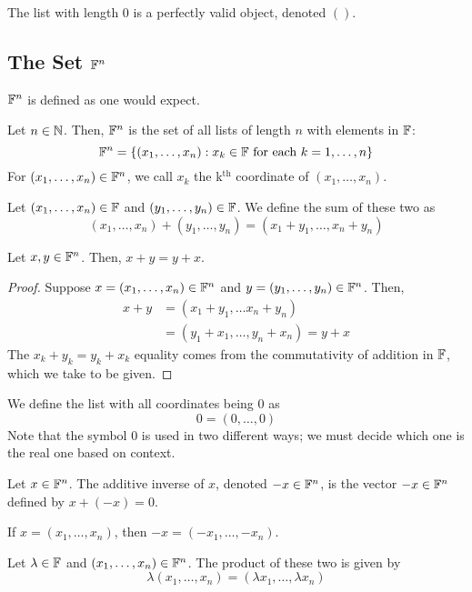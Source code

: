 The list with length $0$ is a perfectly valid object, denoted $()$.
\subsection*{The Set $\F^n$}
$\F^n$ is defined as one would expect.
\begin{definition}[$\F^n$]
    Let $n\in\mathbb{N}$. Then, $\F^n$ is the set of all lists of length $n$ with elements in $\mathbb F$:
    \[ \mathbb F^n = \{ (x_1, \dots, x_n) : x_k\in \mathbb F \text{ for each } k = 1, \dots, n\}  \]
    For $(x_1, \dots, x_n)\in\mathbb F^n$, we call $x_k$ the k$^\text{th}$ coordinate of $(x_1, \dots, x_n)$.
\end{definition}
\begin{definition}[Addition in $\F^n$]
    Let $(x_1, \dots, x_n)\in \mathbb F$ and $(y_1, \dots, y_n)\in \mathbb F$. We define the sum of these two as
    \[ (x_1, \dots, x_n) + (y_1, \dots, y_n) = (x_1 + y_1, \dots, x_n + y_n) \]
\end{definition}
\newpage
\begin{theorem}
    Let $x,y\in \mathbb F^n$. Then, $x+y=y+x$.
\end{theorem}
\begin{proof}
    Suppose $x = (x_1, \dots, x_n)\in \mathbb F^n$ and $y = (y_1, \dots, y_n) \in \mathbb F^n$. Then,
    \begin{align*}
        x+y &= (x_1 + y_1, \dots x_n + y_n) \\
        &= (y_1 + x_1, \dots, y_n + x_n) = y+x
    \end{align*}
    The $x_k + y_k = y_k + x_k$ equality comes from the commutativity of addition in $\mathbb F$, which we take to be given.
\end{proof}
We define the list with all coordinates being $0$ as 
\[ 0 = (0, \dots, 0)\]
Note that the symbol $0$ is used in two different ways; we must decide which one is the real one based on context.
\begin{definition}
    Let $x\in \mathbb F^n$. The additive inverse of $x$, denoted $-x\in \mathbb F^n$, is the vector $-x\in\mathbb F^n$ defined by $x + (-x) = 0$. 

    If $x = (x_1, \dots, x_n)$, then $-x = (-x_1, \dots, -x_n)$.
\end{definition}
\begin{definition}
    Let $\lambda\in \mathbb F$ and $(x_1, \dots, x_n)\in \mathbb F^n$. The product of these two is given by 
    \[ \lambda(x_1, \dots, x_n) = (\lambda x_1, \dots, \lambda x_n)\]
\end{definition}
